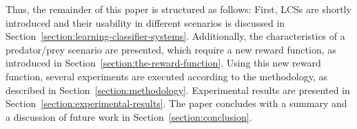 Thus, the remainder of this paper is structured as follows: First, LCSs are shortly introduced and their usability in different scenarios is discussed in Section~\ref{section:learning-classifier-systems}. 
Additionally, the characteristics of a predator/prey scenario are presented, which require a new reward function, as introduced in Section~\ref{section:the-reward-function}. Using this new reward function, several experiments are executed according to the methodology, as described in Section~\ref{section:methodology}. Experimental results are presented in Section~\ref{section:experimental-results}. The paper concludes with a summary and a discussion of future work in Section~\ref{section:conclusion}. %

